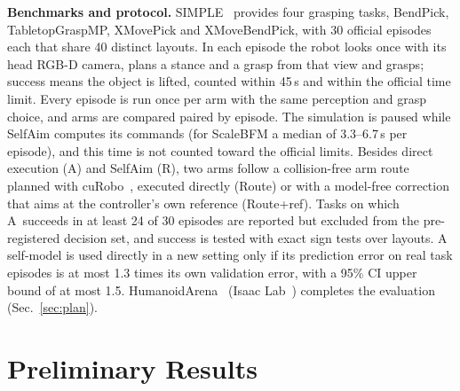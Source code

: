 \documentclass[conference]{IEEEtran}
\newcommand{\Ad}{\textsc{A}}       %
\newcommand{\Rr}{\textsc{R}}       %
\begin{document}
\textbf{Benchmarks and protocol.} SIMPLE~\cite{simple} provides four grasping tasks, BendPick, TabletopGraspMP, XMovePick and XMoveBendPick, with 30 official episodes each that share 40 distinct layouts. In each episode the robot looks once with its head RGB-D camera, plans a stance and a grasp from that view and grasps; success means the object is lifted, counted within 45\,s and within the official time limit. Every episode is run once per arm with the same perception and grasp choice, and arms are compared paired by episode. The simulation is paused while SelfAim computes its commands (for ScaleBFM a median of 3.3--6.7\,s per episode), and this time is not counted toward the official limits. Besides direct execution (\Ad) and SelfAim (\Rr), two arms follow a collision-free arm route planned with cuRobo~\cite{curobo}, executed directly (Route) or with a model-free correction that aims at the controller's own reference (Route+ref). Tasks on which \Ad\ succeeds in at least 24 of 30 episodes are reported but excluded from the pre-registered decision set, and success is tested with exact sign tests over layouts. A self-model is used directly in a new setting only if its prediction error on real task episodes is at most 1.3 times its own validation error, with a 95\% CI upper bound of at most 1.5. HumanoidArena~\cite{humanoidarena} (Isaac Lab~\cite{isaaclab}) completes the evaluation (Sec.~\ref{sec:plan}).

\section{Preliminary Results}\label{sec:prelim}
\end{document}
